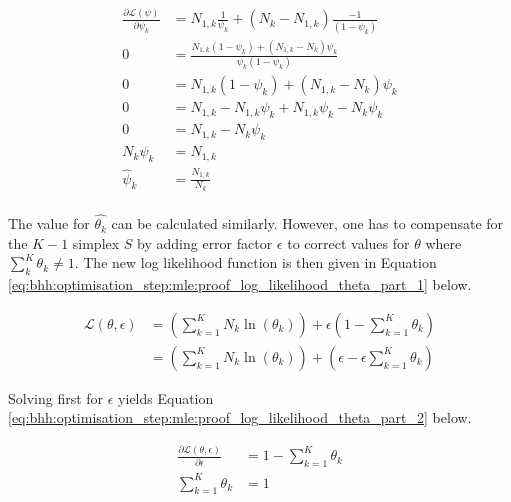 \begin{equation}
    \label{eq:bhh:optimisation_step:mle:proof_log_likelihood_psi}
    \begin{split}
        \frac{\partial \mathcal{L}(\psi)}{\partial \psi_{k}} &= N_{1,k} \frac{1}{ \psi_{k}} + \left( N_{k} - N_{1,k} \right) \frac{-1}{ \left( 1 - \psi_{k} \right) } \\
        0 &=  \frac{ N_{1,k} \left( 1 - \psi_{k} \right) +  \left( N_{1,k} - N_{k} \right) \psi_{k}}{ \psi_{k} \left( 1 - \psi_{k} \right) } \\
        0 &=  N_{1,k} \left( 1 - \psi_{k} \right) +  \left( N_{1,k} - N_{k} \right) \psi_{k} \\
        0 &=  N_{1,k} - N_{1,k} \psi_{k}  +  N_{1,k} \psi_{k} - N_{k}\psi_{k} \\
        0 &=  N_{1,k} - N_{k}\psi_{k} \\
        N_{k}\psi_{k} &=  N_{1,k} \\
        \hat{\psi}_{k} &=  \frac{N_{1,k}}{N_{k}} \\
    \end{split}
\end{equation}


The value for $\hat{\theta_{k}} $ can be calculated similarly. However, one has to compensate for the $K-1$ simplex $S$ by adding error factor $\epsilon$ to correct values for  $\theta$ where $\sum_{k}^{K} \theta_{k} \neq 1$. The new log likelihood function is then given in Equation \ref{eq:bhh:optimisation_step:mle:proof_log_likelihood_theta_part_1} below.

\begin{equation}
    \label{eq:bhh:optimisation_step:mle:proof_log_likelihood_theta_part_1}
    \begin{split}
        \mathcal{L}(\theta, \epsilon)
        &=  \left( \sum_{k=1}^{K} N_{k} \ln \left( \theta_{k} \right) \right) + \epsilon \left( 1 - \sum_{k=1}^{K} \theta_{k} \right) \\
        &=  \left( \sum_{k=1}^{K} N_{k} \ln \left( \theta_{k} \right) \right) + \left( \epsilon -  \epsilon \sum_{k=1}^{K} \theta_{k} \right)
    \end{split}
\end{equation}

Solving first for $\epsilon$ yields Equation \ref{eq:bhh:optimisation_step:mle:proof_log_likelihood_theta_part_2} below.

\begin{equation}
    \label{eq:bhh:optimisation_step:mle:proof_log_likelihood_theta_part_2}
    \begin{split}
        \frac{\partial \mathcal{L}(\theta, \epsilon)}{\partial \epsilon} &= 1 - \sum_{k=1}^{K} \theta_{k}  \\
        \sum_{k=1}^{K} \theta_{k}  &= 1
    \end{split}
\end{equation}

